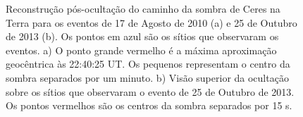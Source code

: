 \documentclass[12pt,a4paper]{report}
\begin{document}
\begin{figure}[h]
\begin{centering}
\caption{Reconstrução pós-ocultação do caminho da sombra de Ceres na Terra para os eventos de 17 de Agosto de 2010 (a) e 25 de Outubro de 2013 (b). Os pontos em azul são os sítios que observaram os eventos. a) O ponto grande vermelho é a máxima aproximação geocêntrica às 22:40:25 UT. Os pequenos representam o centro da sombra separados por um minuto. b) Visão superior da ocultação sobre os sítios que observaram o evento de 25 de Outubro de 2013. Os pontos vermelhos são os centros da sombra separados por 15 s.
\label{Fig: Ceres-map}}
\end{centering}
\end{figure}
\end{document}
